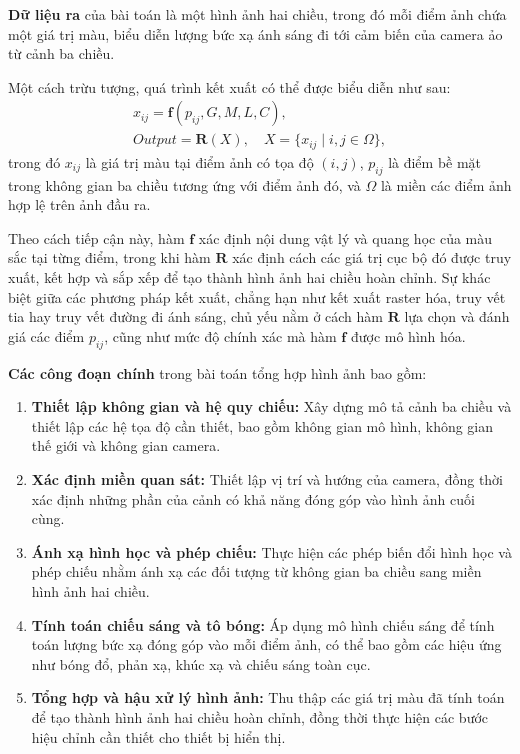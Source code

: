 \textbf{Dữ liệu ra} của bài toán là một hình ảnh hai chiều, trong đó mỗi điểm ảnh chứa một giá trị màu, biểu diễn lượng bức xạ ánh sáng đi tới cảm biến của camera ảo từ cảnh ba chiều.

Một cách trừu tượng, quá trình kết xuất có thể được biểu diễn như sau:
\begin{gather*}
	x_{ij} = \textbf{f}(p_{ij}, G, M, L, C), \\
	Output = \textbf{R}(X), \quad X = \{ x_{ij} \mid i, j \in \Omega \},
\end{gather*}
trong đó $x_{ij}$ là giá trị màu tại điểm ảnh có tọa độ $(i, j)$, $p_{ij}$ là điểm bề mặt trong không gian ba chiều tương ứng với điểm ảnh đó, và $\Omega$ là miền các điểm ảnh hợp lệ trên ảnh đầu ra.

Theo cách tiếp cận này, hàm $\textbf{f}$ xác định nội dung vật lý và quang học của màu sắc tại từng điểm, trong khi hàm $\textbf{R}$ xác định cách các giá trị cục bộ đó được truy xuất, kết hợp và sắp xếp để tạo thành hình ảnh hai chiều hoàn chỉnh. Sự khác biệt giữa các phương pháp kết xuất, chẳng hạn như kết xuất raster hóa, truy vết tia hay truy vết đường đi ánh sáng, chủ yếu nằm ở cách hàm $\textbf{R}$ lựa chọn và đánh giá các điểm $p_{ij}$, cũng như mức độ chính xác mà hàm $\textbf{f}$ được mô hình hóa.

\textbf{Các công đoạn chính} trong bài toán tổng hợp hình ảnh bao gồm:

\begin{enumerate}
	\item \textbf{Thiết lập không gian và hệ quy chiếu:} Xây dựng mô tả cảnh ba chiều và thiết lập các hệ tọa độ cần thiết, bao gồm không gian mô hình, không gian thế giới và không gian camera.
	\item \textbf{Xác định miền quan sát:} Thiết lập vị trí và hướng của camera, đồng thời xác định những phần của cảnh có khả năng đóng góp vào hình ảnh cuối cùng.
	\item \textbf{Ánh xạ hình học và phép chiếu:} Thực hiện các phép biến đổi hình học và phép chiếu nhằm ánh xạ các đối tượng từ không gian ba chiều sang miền hình ảnh hai chiều.
	\item \textbf{Tính toán chiếu sáng và tô bóng:} Áp dụng mô hình chiếu sáng để tính toán lượng bức xạ đóng góp vào mỗi điểm ảnh, có thể bao gồm các hiệu ứng như bóng đổ, phản xạ, khúc xạ và chiếu sáng toàn cục.
	\item \textbf{Tổng hợp và hậu xử lý hình ảnh:} Thu thập các giá trị màu đã tính toán để tạo thành hình ảnh hai chiều hoàn chỉnh, đồng thời thực hiện các bước hiệu chỉnh cần thiết cho thiết bị hiển thị.
\end{enumerate}

